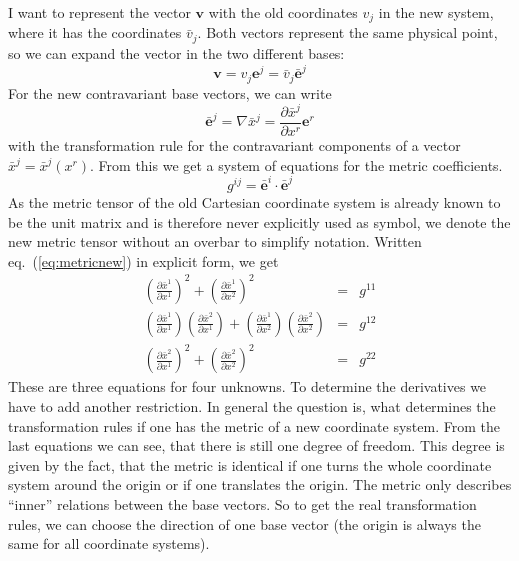 I want to represent the vector $\mathbf{v}$ with the old 
coordinates $v_j$ in the new system, where it has the 
coordinates $\bar v_j$. Both vectors represent the same physical
point, so we can expand the vector in the two different bases:
\begin{equation}
  \label{eq:vecrepr}
  \mathbf{v}=v_j\mathbf{e}^j=\bar v_j\bar{\mathbf{e}}^j
\end{equation}
For the new contravariant base vectors, we can write
\begin{displaymath}
  \bar{\mathbf{e}}^j = \nabla\bar x^j
  =\frac{\partial\bar x^j}{\partial x^r}\mathbf{e}^r
\end{displaymath}
with the transformation rule for the contravariant components of a
vector $\bar{x}^j=\bar{x}^j(x^r)$. 
From this we get a system of equations for the metric coefficients.
\begin{equation}
  \label{eq:metricnew}
  g^{ij} = \bar{\mathbf{e}}^i\cdot\bar{\mathbf{e}}^j
\end{equation}
As the metric tensor of the old Cartesian coordinate system is already
known to be the unit matrix and is therefore never explicitly used as
symbol, we denote the new metric tensor without an overbar to simplify
notation. Written eq.~(\ref{eq:metricnew}) in explicit form, we get
\begin{eqnarray*}
  \left(
    \frac{\partial\bar x^1}{\partial x^1}
  \right)^2+\left(
    \frac{\partial\bar x^1}{\partial x^2}
  \right)^2 &=& g^{11}\\
  \left(
    \frac{\partial\bar x^1}{\partial x^1}
  \right)\left(
    \frac{\partial\bar x^2}{\partial x^1}
  \right)
  + \left(
    \frac{\partial\bar x^1}{\partial x^2}
  \right)\left(
    \frac{\partial\bar x^2}{\partial x^2}
  \right) &=& g^{12}\\
  \left(
    \frac{\partial\bar x^2}{\partial x^1}
  \right)^2
  +\left(
    \frac{\partial\bar x^2}{\partial x^2}
  \right)^2 &=& g^{22}
\end{eqnarray*}
These are three equations for four unknowns. To determine the
derivatives we have to add another restriction. In general the
question is, what determines the transformation rules if one has the
metric of a new coordinate system. From the last equations we can see,
that there is still one degree of freedom. This degree is given by the
fact, that the metric is identical if one turns the whole coordinate
system around the origin or if one translates the origin. The metric
only describes ``inner'' relations between the base vectors. So to get
the real transformation rules, we can choose the direction of one base
vector (the origin is always the same for all coordinate systems). 

